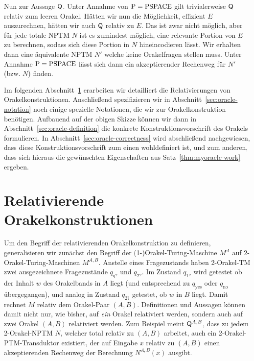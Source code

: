 Nun zur Aussage $\mathsf{Q}$. Unter Annahme von $\mathrm{P}=\mathrm{PSPACE}$ gilt trivialerweise $\mathsf{Q}$ relativ zum leeren Orakel. 
Hätten wir nun die Möglichkeit, effizient $E$ auszurechnen, hätten wir auch $\mathsf{Q}$ relativ zu $E$.
Das ist zwar nicht möglich, aber für jede totale NPTM $N$ ist es zumindest möglich, eine relevante Portion von $E$ zu berechnen, sodass sich diese Portion in $N$ hineincodieren lässt. Wir erhalten dann eine äquivalente NPTM $N'$ welche keine Orakelfragen stellen muss. Unter Annahme $\mathrm{P}=\mathrm{PSPACE}$ lässt sich dann ein akzeptierender Rechenweg für $N'$ (bzw. $N$) finden.


Im folgenden Abschnitt~\ref{sec:oracle-relativization} erarbeiten wir detailliert die Relativierungen von Orakelkonstruktionen.
Anschließend spezifizieren wir in Abschnitt~\ref{sec:oracle-notation} noch einige spezielle Notationen, die wir zur Orakelkonstruktion benötigen.
Aufbauend auf der obigen Skizze können wir dann in Abschnitt~\ref{sec:oracle-definition} die konkrete Konstruktionsvorschrift des Orakels formulieren.
In Abschnitt~\ref{sec:oracle-correctness} wird abschließend nachgewiesen, dass diese Konstruktionsvorschrift zum einen wohldefiniert ist, und zum anderen, dass sich hieraus die gewünschten Eigenschaften aus Satz~\ref{thm:myoracle-work} ergeben.
\pagebreak


\section{Relativierende Orakelkonstruktionen}\label{sec:oracle-relativization}

Um den Begriff der relativierenden Orakelkonstruktion zu definieren, generalisieren wir zunächst den Begriff der (1-)Orakel-Turing-Maschine $M^A$ auf 2-Orakel-Turing-Maschinen $M^{A,B}$. Anstelle eines Fragezustands haben 2-Orakel-TM zwei ausgezeichnete Fragezustände $q_{q?}$ und $q_{2?}$. 
Im Zustand $q_{1?}$ wird getestet ob der Inhalt $w$ des Orakelbands in $A$ liegt (und entsprechend zu $q_{\text{yes}}$ oder $q_{\text{no}}$ übergegangen), und analog in Zustand $q_{2?}$ getestet, ob $w$ in $B$ liegt.
Damit rechnet $M$ relativ dem Orakel-Paar $(A,B)$. 
Definitionen und Aussagen können damit nicht nur, wie bisher, auf \emph{ein} Orakel relativiert werden, sondern auch auf zwei Orakel $(A,B)$ relativiert werden.
Zum Beispiel meint $\mathsf{Q}^{A,B}$, dass zu jedem 2-Orakel-NPTM $N$, welcher total relativ zu $(A,B)$ arbeitet, auch ein 2-Orakel-PTM-Transduktor existiert, der auf Eingabe $x$ relativ zu $(A,B)$ einen akzeptierenden Rechenweg der Berechnung $N^{A,B}(x)$ ausgibt.

